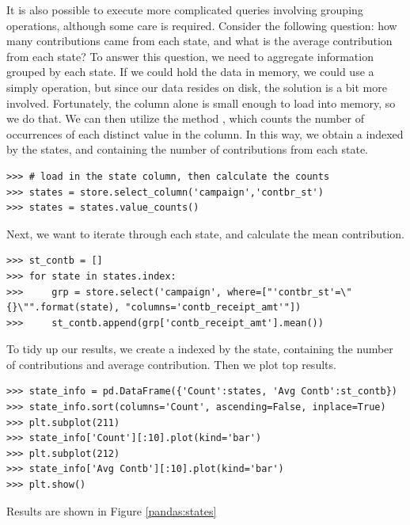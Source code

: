 It is also possible to execute more complicated queries involving grouping operations, although some care is required.
Consider the following question: how many contributions came from each state, and what is the average contribution
from each state? To answer this question, we need to aggregate information grouped by each state. If we could hold
the data in memory, we could use a simply  operation, but since our data resides on disk, the solution is
a bit more involved. Fortunately, the  column alone is small enough to load into memory, so we do that.
We can then utilize the  method , which counts the number of occurrences of each distinct
value in the column. In this way, we obtain a  indexed by the states, and containing the number of 
contributions from each state.
\begin{lstlisting}
>>> # load in the state column, then calculate the counts
>>> states = store.select_column('campaign','contbr_st')
>>> states = states.value_counts()
\end{lstlisting} 
Next, we want to iterate through each state, and calculate the mean contribution.
\begin{lstlisting}
>>> st_contb = []
>>> for state in states.index:
>>>     grp = store.select('campaign', where=["'contbr_st'=\"{}\"".format(state), "columns='contb_receipt_amt'"])
>>>     st_contb.append(grp['contb_receipt_amt'].mean())
\end{lstlisting}
To tidy up our results, we create a  indexed by the state, containing the number of contributions
and average contribution. Then we plot top results.
\begin{lstlisting}
>>> state_info = pd.DataFrame({'Count':states, 'Avg Contb':st_contb})
>>> state_info.sort(columns='Count', ascending=False, inplace=True)
>>> plt.subplot(211)
>>> state_info['Count'][:10].plot(kind='bar')
>>> plt.subplot(212)
>>> state_info['Avg Contb'][:10].plot(kind='bar')
>>> plt.show()
\end{lstlisting}
Results are shown in Figure \ref{pandas:states}
